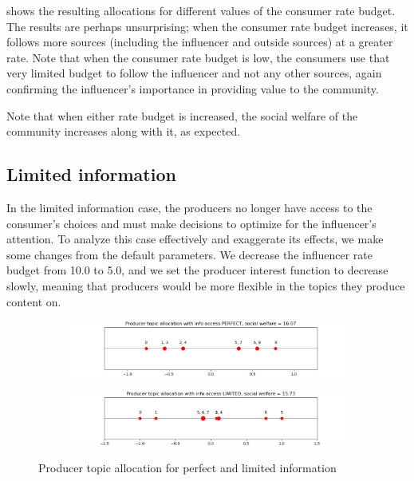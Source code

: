 \documentclass[11pt, letterpaper]{article}
\begin{document}
 shows the resulting allocations for different values of the consumer rate budget. The results are perhaps unsurprising; when the consumer rate budget increases, it follows more sources (including the influencer and outside sources) at a greater rate. Note that when the consumer rate budget is low, the consumers use that very limited budget to follow the influencer and not any other sources, again confirming the influencer's importance in providing value to the community.

Note that when either rate budget is increased, the social welfare of the community increases along with it, as expected.

\subsection{Limited information}

In the limited information case, the producers no longer have access to the consumer's choices and must make decisions to optimize for the influencer's attention. To analyze this case effectively and exaggerate its effects, we make some changes from the default parameters. We decrease the influencer rate budget from 10.0 to 5.0, and we set the producer interest function to decrease slowly, meaning that producers would be more flexible in the topics they produce content on.

\begin{figure}[h]
    \centering
        \begin{subfigure}[b]{0.7\textwidth}
            \includegraphics[width=\linewidth]{"figures/lim/1_topics.jpg"}
        \end{subfigure}
        \begin{subfigure}[b]{0.7\textwidth}
            \includegraphics[width=\linewidth]{"figures/lim/2_topics.jpg"}
        \end{subfigure}
\caption{Producer topic allocation for perfect and limited information}
\label{fig:lim_topics}
\end{figure}
\end{document}
